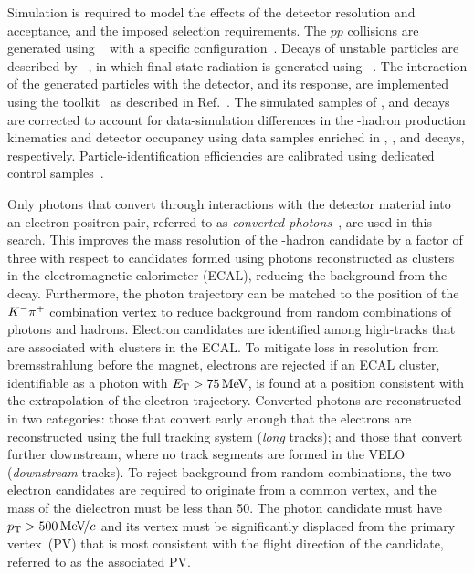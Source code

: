 Simulation is required to model the effects of the detector resolution and acceptance, and the imposed selection requirements.
The $pp$ collisions are generated using \pythia~\cite{Sjostrand:2007gs,*Sjostrand:2006za} with a specific \lhcb configuration~\cite{LHCb-PROC-2010-056}.
Decays of unstable particles are described by \evtgen~\cite{Lange:2001uf}, in which final-state radiation is generated using \photos~\cite{davidson2015photos}.
The interaction of the generated particles with the detector, and its response, are implemented using the \geant toolkit~\cite{Allison:2006ve, *Agostinelli:2002hh} as described in Ref.~\cite{LHCb-PROC-2011-006}.
The simulated samples of \Bd, \Bs and \Lb decays are corrected to account for data-simulation differences in the \bquark-hadron production kinematics and detector occupancy using data samples enriched in \bdkpig, \bskkg, and \lbpkg decays, respectively.
Particle-identification efficiencies are calibrated using dedicated control samples~\cite{LHCb-DP-2018-001}.

Only photons that convert through interactions with the detector material into an electron-positron pair, referred to as \emph{converted photons}~\cite{LHCb-PAPER-2013-028,LHCb-PAPER-2014-040,LHCb-PAPER-2015-044}, are used in this search.
This improves the mass resolution of the \bquark-hadron candidate by a factor of three with respect to candidates formed using photons reconstructed as clusters in the electromagnetic calorimeter (ECAL), reducing the background from the \bdkpig decay. Furthermore, the photon trajectory can be matched to the position of the ${{K}^-}{{\pi}^+}$ combination vertex to reduce background from random combinations of photons and hadrons.
Electron candidates are identified among high-\pt tracks that are associated with clusters in the ECAL.
To mitigate loss in resolution from bremsstrahlung before the magnet, electrons are rejected if an ECAL cluster, identifiable as a photon with $E_{\mathrm{T}}>75\text{\,Me\kern -0.1em V}$, is found at a position consistent with the extrapolation of the electron trajectory.
Converted photons are reconstructed in two categories: those that convert early enough that the electrons are reconstructed using the full tracking system (\emph{long} tracks); and those that convert further downstream, where no track segments are formed in the VELO (\emph{downstream} tracks).
To reject background from random combinations, the two electron candidates are required to originate from a common vertex, and the mass of the dielectron must be less than \mbox{50\mevcc}.
The photon candidate must have $p_{\mathrm{T}}>500\text{\,Me\kern -0.1em V\!/}c$ and its vertex must be significantly displaced from the primary vertex~(PV) that is most consistent with the flight direction of the \B candidate, referred to as the associated PV.

